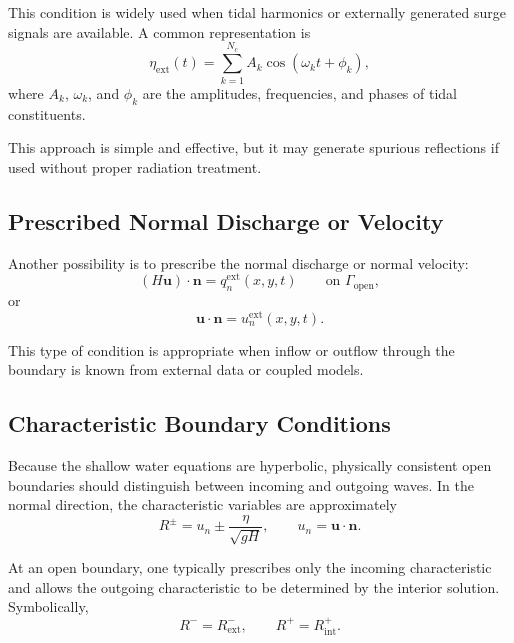 \documentclass[11pt]{article}
\begin{document}
This condition is widely used when tidal harmonics or externally generated surge signals are available. A common representation is
\begin{equation}
\eta_{\mathrm{ext}}(t)
=
\sum_{k=1}^{N_c} A_k \cos(\omega_k t + \phi_k),
\end{equation}
where \(A_k\), \(\omega_k\), and \(\phi_k\) are the amplitudes, frequencies, and phases of tidal constituents.

This approach is simple and effective, but it may generate spurious reflections if used without proper radiation treatment.

\subsection{Prescribed Normal Discharge or Velocity}

Another possibility is to prescribe the normal discharge or normal velocity:
\begin{equation}
(H\bm{u})\cdot\bm{n} = q_n^{\mathrm{ext}}(x,y,t)
\qquad \text{on } \Gamma_{\mathrm{open}},
\end{equation}
or
\begin{equation}
\bm{u}\cdot\bm{n} = u_n^{\mathrm{ext}}(x,y,t).
\end{equation}

This type of condition is appropriate when inflow or outflow through the boundary is known from external data or coupled models.

\subsection{Characteristic Boundary Conditions}

Because the shallow water equations are hyperbolic, physically consistent open boundaries should distinguish between incoming and outgoing waves. In the normal direction, the characteristic variables are approximately
\begin{equation}
R^{\pm} = u_n \pm \frac{\eta}{\sqrt{gH}},
\qquad
u_n = \bm{u}\cdot\bm{n}.
\end{equation}

At an open boundary, one typically prescribes only the incoming characteristic and allows the outgoing characteristic to be determined by the interior solution. Symbolically,
\begin{equation}
R^- = R^-_{\mathrm{ext}}, \qquad R^+ = R^+_{\mathrm{int}}.
\end{equation}
\end{document}
